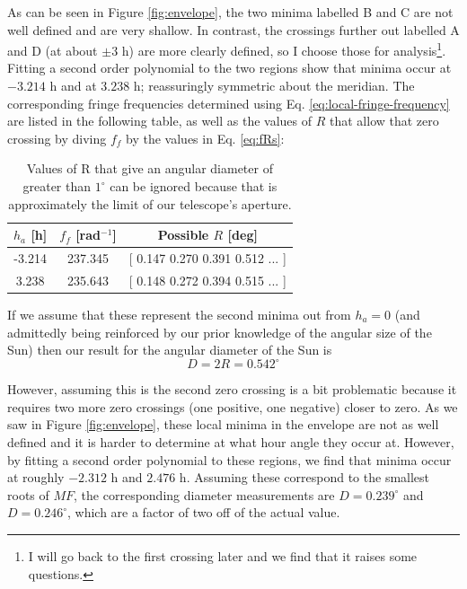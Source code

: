 \documentclass[12pt]{article}
\begin{document}
As can be seen in Figure \ref{fig:envelope}, the two minima labelled B and C are not well defined and are very shallow. In contrast, the crossings further out labelled A and D (at about $\pm3$ h) are more clearly defined, so I choose those for analysis\footnote{I will go back to the first crossing later and we find that it raises some questions.}. Fitting a second order polynomial to the two regions show that minima occur at $-3.214$ h and at $3.238$ h; reassuringly symmetric about the meridian. The corresponding fringe frequencies determined using Eq. \ref{eq:local-fringe-frequency} are listed in the following table, as well as the values of $R$ that allow that zero crossing by diving $f_f$ by the values in Eq. \ref{eq:fRs}:
\begin{table}[H]
\begin{center}
  \begin{tabular}{c | c | c }
    $h_a$ [h] & $f_f$ [rad$^{-1}$] & Possible $R$ [deg]\\ \hline
    -3.214 & 237.345 & [ 0.147  0.270  0.391  0.512  ... ] \\
    3.238 & 235.643 &  [ 0.148  0.272  0.394  0.515  ... ] \\
    \end{tabular}
\end{center}
\caption{Values of R that give an angular diameter of greater than $1^\circ$ can be ignored because that is approximately the limit of our telescope's aperture.}
\label{tbl:firfrequencies}
\end{table}

If we assume that these represent the second minima out from $h_a=0$ (and admittedly being reinforced by our prior knowledge of the angular size of the Sun) then our result for the angular diameter of the Sun is
\begin{equation}
D = 2R = 0.542^\circ \nonumber \label{eq:size-of-sun}
\end{equation}

However, assuming this is the second zero crossing is a bit problematic because it requires two more zero crossings (one positive, one negative) closer to zero. As we saw in Figure \ref{fig:envelope}, these local minima in the envelope are not as well defined and it is harder to determine at what hour angle they occur at. However, by fitting a second order polynomial to these regions, we find that minima occur at roughly $-2.312$ h and $2.476$ h. Assuming these correspond to the smallest roots of $MF$, the corresponding diameter measurements are $D = 0.239^\circ$ and $D = 0.246^\circ$, which are a factor of two off of the actual value.
\end{document}
